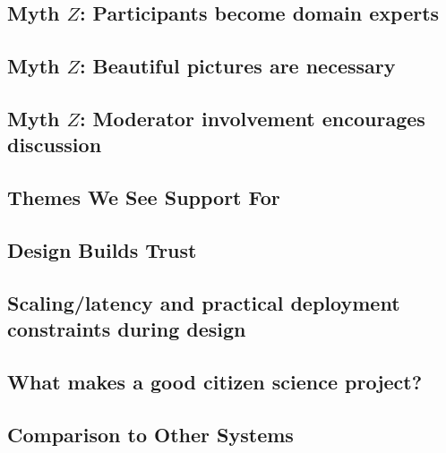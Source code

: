 \documentclass{sigchi}
\begin{document}
\subsection{Myth $Z$: Participants become domain experts}
\subsection{Myth $Z$: Beautiful pictures are necessary}
\subsection{Myth $Z$: Moderator involvement encourages discussion}

\subsection{Themes We See Support For}
\subsection{Design Builds Trust}
\subsection{Scaling/latency and practical deployment constraints during design}
\subsection{What makes a good citizen science project?}

\subsection{Comparison to Other Systems}


\end{document}
